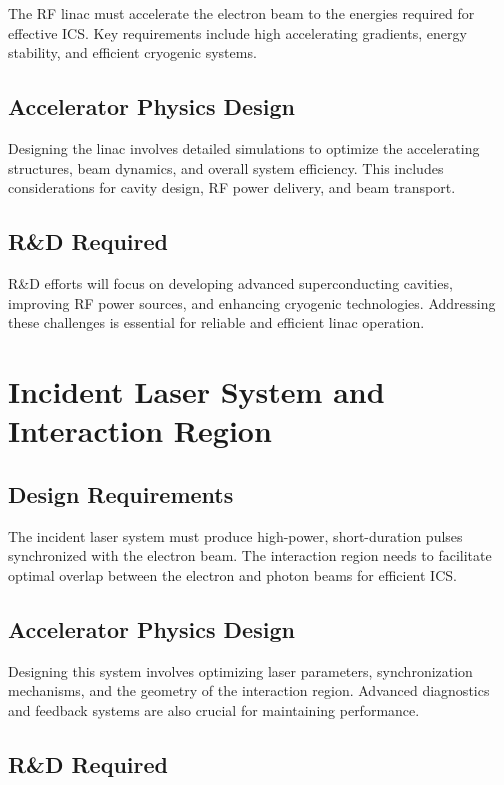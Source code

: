 \documentclass[10pt]{article}
\newcommand{\blankline}{\quad\pagebreak[3]}
\begin{document}
  The RF linac must accelerate the electron beam to the energies required for effective ICS. Key requirements include high accelerating gradients, energy stability, and efficient cryogenic systems.
  
  \subsection{Accelerator Physics Design}
  
  Designing the linac involves detailed simulations to optimize the accelerating structures, beam dynamics, and overall system efficiency. This includes considerations for cavity design, RF power delivery, and beam transport.
  
  \subsection{R\&D Required}  
  
  R\&D efforts will focus on developing advanced superconducting cavities, improving RF power sources, and enhancing cryogenic technologies. Addressing these challenges is essential for reliable and efficient linac operation.
  

\blankline
\blankline

\section{Incident Laser System and Interaction Region}

  \subsection{Design Requirements}
  
  The incident laser system must produce high-power, short-duration pulses synchronized with the electron beam. The interaction region needs to facilitate optimal overlap between the electron and photon beams for efficient ICS.
  
  \subsection{Accelerator Physics Design}
  
  Designing this system involves optimizing laser parameters, synchronization mechanisms, and the geometry of the interaction region. Advanced diagnostics and feedback systems are also crucial for maintaining performance.
  
  \subsection{R\&D Required}  
  
\end{document}
